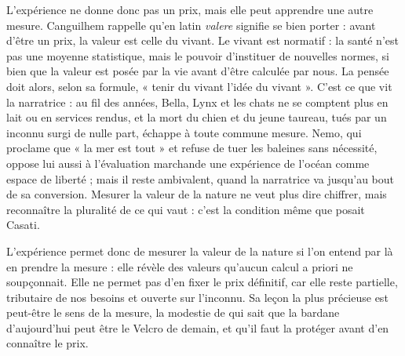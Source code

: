\documentclass[11pt,a4paper]{article}
\begin{document}
L'expérience ne donne donc pas un prix, mais elle peut apprendre une autre mesure. Canguilhem rappelle qu'en latin \emph{valere} signifie se bien porter : avant d'être un prix, la valeur est celle du vivant. Le vivant est normatif : la santé n'est pas une moyenne statistique, mais le pouvoir d'instituer de nouvelles normes, si bien que la valeur est posée par la vie avant d'être calculée par nous. La pensée doit alors, selon sa formule, « tenir du vivant l'idée du vivant ». C'est ce que vit la narratrice : au fil des années, Bella, Lynx et les chats ne se comptent plus en lait ou en services rendus, et la mort du chien et du jeune taureau, tués par un inconnu surgi de nulle part, échappe à toute commune mesure. Nemo, qui proclame que « la mer est tout » et refuse de tuer les baleines sans nécessité, oppose lui aussi à l'évaluation marchande une expérience de l'océan comme espace de liberté ; mais il reste ambivalent, quand la narratrice va jusqu'au bout de sa conversion. Mesurer la valeur de la nature ne veut plus dire chiffrer, mais reconnaître la pluralité de ce qui vaut : c'est la condition même que posait Casati.

L'expérience permet donc de mesurer la valeur de la nature si l'on entend par là en prendre la mesure : elle révèle des valeurs qu'aucun calcul a priori ne soupçonnait. Elle ne permet pas d'en fixer le prix définitif, car elle reste partielle, tributaire de nos besoins et ouverte sur l'inconnu. Sa leçon la plus précieuse est peut-être le sens de la mesure, la modestie de qui sait que la bardane d'aujourd'hui peut être le Velcro de demain, et qu'il faut la protéger avant d'en connaître le prix.
\end{document}
